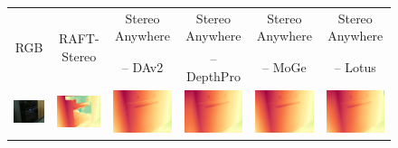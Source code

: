 \documentclass[10pt,twocolumn,letterpaper]{article}
\newcommand{\method}[0]{Stereo Anywhere\xspace}
\begin{document}
\begin{figure}[h]
    \centering
    \renewcommand{\tabcolsep}{1pt}
    \begin{tabular}{cccccc}

    \multirow{2}{*}{\small RGB} & \multirow{2}{*}{\small RAFT-Stereo \cite{lipson2021raft}} & \small \method & \small \method & \small \method & \small \method \\

     &  & \small -- DAv2 \cite{depth_anything_v2} & \small -- DepthPro \cite{depthpro} & \small -- MoGe \cite{wang2024moge} & \small -- Lotus \cite{he2024lotus} \\

    \includegraphics[width=0.16\linewidth]{imgs/multiple_vfms/booster_multiple_vfms/0.jpg} &
    \includegraphics[width=0.16\linewidth]{imgs/multiple_vfms/booster_multiple_vfms/_raft-stereo.jpg} &
    \includegraphics[width=0.16\linewidth]{imgs/multiple_vfms/booster_multiple_vfms/_ours_dav2.jpg} &
    \includegraphics[width=0.16\linewidth]{imgs/multiple_vfms/booster_multiple_vfms/_ours_depthpro.jpg} &
    \includegraphics[width=0.16\linewidth]{imgs/multiple_vfms/booster_multiple_vfms/_ours_moge.jpg} &
    \includegraphics[width=0.16\linewidth]{imgs/multiple_vfms/booster_multiple_vfms/_ours_lotus.jpg} \\


\end{tabular}
\end{figure}
\end{document}
